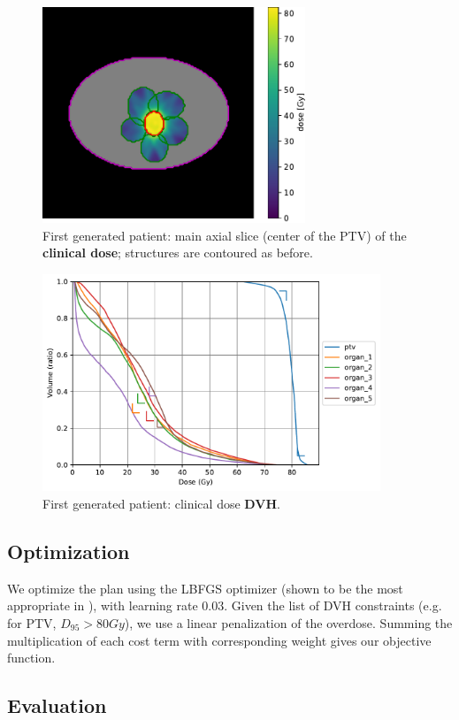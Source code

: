 \begin{figure}
	\centering
	\includegraphics[width=0.7\textwidth]{main_slice-dose.pdf}
	\caption{First generated patient: main axial slice (center of the PTV) of the \textbf{clinical dose}; structures are contoured as before.}
	\label{fig:main_slice-dose}
\end{figure}
\begin{figure}
	\centering
	\includegraphics[width=0.9\textwidth]{dvh_example.pdf}
	\caption{First generated patient: clinical dose \textbf{DVH}.}
	\label{fig:clinical_dvh}
\end{figure}

\subsection*{Optimization}
We optimize the plan using the LBFGS optimizer (shown to be the most appropriate in \cite{dubois_radiotherapy_2023}), with learning rate $0.03$.
Given the list of DVH constraints (e.g. for PTV, $D_{95}>80Gy$), we use a linear penalization of the overdose.
Summing the multiplication of each cost term with corresponding weight gives our objective function.

\subsection*{Evaluation}

